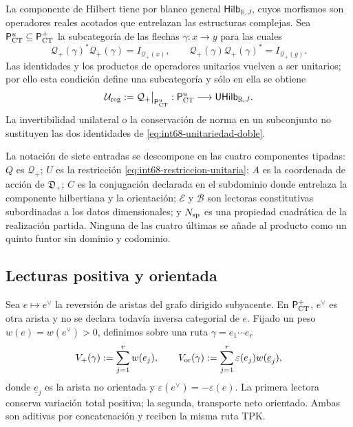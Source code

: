 La componente de Hilbert tiene por blanco general
\(\mathsf{Hilb}_{\mathbb R,J}\), cuyos morfismos son operadores reales
acotados que entrelazan las estructuras complejas. Sea
\(\mathsf P_{\rm CT}^{u}\subseteq\mathsf P_{\rm CT}^{+}\) la subcategoría
de las flechas \(\gamma:x\to y\) para las cuales
\begin{equation}
 \mathcal Q_+(\gamma)^*\mathcal Q_+(\gamma)=I_{\mathcal Q_+(x)},
 \qquad
 \mathcal Q_+(\gamma)\mathcal Q_+(\gamma)^*=I_{\mathcal Q_+(y)}.
 \label{eq:int68-unitariedad-doble}
\end{equation}
Las identidades y los productos de operadores unitarios vuelven a ser
unitarios; por ello esta condición define una subcategoría y sólo en ella se
obtiene
\begin{equation}
 \mathcal U_{\rm reg}:=
 \mathcal Q_+\big|_{\mathsf P_{\rm CT}^{u}}:
 \mathsf P_{\rm CT}^{u}\longrightarrow
 \mathsf{UHilb}_{\mathbb R,J}.
 \label{eq:int68-restriccion-unitaria}
\end{equation}
La invertibilidad unilateral o la conservación de norma en un subconjunto no
sustituyen las dos identidades de \eqref{eq:int68-unitariedad-doble}.

La notación de siete entradas se descompone en las cuatro componentes
tipadas: \(Q\) es \(\mathcal Q_+\);
\(U\) es la restricción \eqref{eq:int68-restriccion-unitaria}; \(A\) es la
coordenada de acción de \(\mathfrak D_+\); \(C\) es la conjugación declarada
en el subdominio donde entrelaza la componente hilbertiana y la orientación;
\(\mathcal E\) y \(\mathcal B\) son lectoras constitutivas subordinadas a
los datos dimensionales; y \(N_{\rm sp}\) es una propiedad cuadrática de la
realización partida. Ninguna de las cuatro últimas se añade al producto como
un quinto funtor sin dominio y codominio.

\subsection{Lecturas positiva y orientada}

Sea \(e\mapsto e^\vee\) la reversión de aristas del grafo dirigido
subyacente. En \(\mathsf P_{\rm CT}^{+}\), \(e^\vee\) es otra arista y no
se declara todavía inversa categorial de \(e\). Fijado un peso
\(w(e)=w(e^\vee)>0\), definimos sobre una ruta
\(\gamma=e_1\cdots e_r\)
\[
 V_+(\gamma):=\sum_{j=1}^r w(e_j),
 \qquad
 V_{\rm or}(\gamma):=
 \sum_{j=1}^r\varepsilon(e_j)w(\underline e_j),
\]
donde \(\underline e_j\) es la arista no orientada y
\(\varepsilon(e^\vee)=-\varepsilon(e)\). La primera lectora conserva
variación total positiva; la segunda, transporte neto orientado. Ambas son
aditivas por concatenación y reciben la misma ruta TPK.

